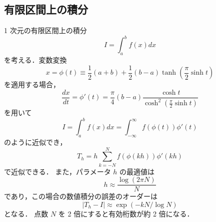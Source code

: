 \subsection{有限区間上の積分}

1 次元の有限区間上の積分
\begin{equation}
    I = \int_{a}^{b} f(x) dx
\end{equation}
を考える．変数変換
\begin{equation}
    x = \phi(t) \equiv \frac{1}{2}(a + b) + \frac{1}{2}(b - a) \tanh \left(\frac{\pi}{2} \sinh{t}\right)
\end{equation}
を適用する場合，
\begin{equation}
    \frac{dx}{dt} = \phi'(t)
    = \frac{\pi}{4} (b - a) \frac{\cosh{t}}{\cosh^2 \left(\frac{\pi}{2} \sinh{t}\right)}
\end{equation}
を用いて
\begin{equation}
    I = \int_{a}^{b} f(x) dx
    = \int_{-\infty}^{\infty} f(\phi(t)) \phi'(t)
\end{equation}
のように近似でき，
\begin{equation}
    T_h = h \sum_{k = -N}^{N} f(\phi(kh)) \phi'(kh)
\end{equation}
で近似できる．
また，パラメータ $h$ の最適値は
\begin{equation}
    h \approx \frac{\log(2 \pi N)}{N}
\end{equation}
であり，この場合の数値積分の誤差のオーダーは
\begin{equation}
    |T_h - I| \approx \exp(-kN / \log{N})
\end{equation}
となる\cite[Section 4.5]{Press2007}．
点数 $N$ を 2 倍にすると有効桁数が約 2 倍になる．

